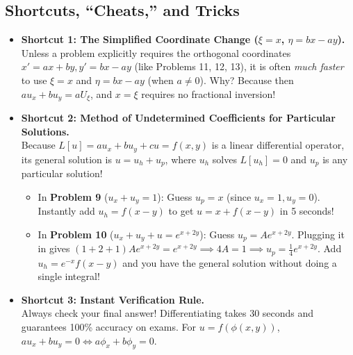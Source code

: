 \documentclass[11pt]{article}
\begin{document}
\subsection{Shortcuts, ``Cheats,'' and Tricks}
\begin{itemize}
    \item \textbf{Shortcut 1: The Simplified Coordinate Change ($\xi = x$, $\eta = bx - ay$).} \\
    Unless a problem explicitly requires the orthogonal coordinates $x' = ax + by, y' = bx - ay$ (like Problems 11, 12, 13), it is often \emph{much faster} to use $\xi = x$ and $\eta = bx - ay$ (when $a \neq 0$). Why? Because then $au_x + bu_y = aU_\xi$, and $x = \xi$ requires no fractional inversion!
    \item \textbf{Shortcut 2: Method of Undetermined Coefficients for Particular Solutions.} \\
    Because $L[u] = au_x + bu_y + cu = f(x, y)$ is a linear differential operator, its general solution is $u = u_h + u_p$, where $u_h$ solves $L[u_h] = 0$ and $u_p$ is any particular solution!
    \begin{itemize}
        \item In \textbf{Problem 9} ($u_x + u_y = 1$): Guess $u_p = x$ (since $u_x = 1, u_y = 0$). Instantly add $u_h = f(x - y)$ to get $u = x + f(x - y)$ in 5 seconds!
        \item In \textbf{Problem 10} ($u_x + u_y + u = e^{x+2y}$): Guess $u_p = Ae^{x+2y}$. Plugging it in gives $(1 + 2 + 1)Ae^{x+2y} = e^{x+2y} \implies 4A = 1 \implies u_p = \frac{1}{4}e^{x+2y}$. Add $u_h = e^{-x}f(x - y)$ and you have the general solution without doing a single integral!
    \end{itemize}
    \item \textbf{Shortcut 3: Instant Verification Rule.} \\
    Always check your final answer! Differentiating takes 30 seconds and guarantees 100\% accuracy on exams. For $u = f(\phi(x, y))$, $a u_x + b u_y = 0 \iff a\phi_x + b\phi_y = 0$.
\end{itemize}
\end{document}
